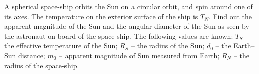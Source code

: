 A spherical space-ship orbits the Sun on a circular orbit, and spin around
one of its axes. The temperature on the exterior surface of the ship is
$T_N$. Find out the apparent magnitude of the Sun and the angular diameter
of the Sun as seen by the astronaut on board of the space-ship. The
following values are known: $T_S$ -- the effective temperature of the Sun;
$R_S$ -- the radius of the Sun; $d_0$ -- the Earth--Sun distance; $m_0$ --
apparent magnitude of Sun measured from Earth; $R_N$ -- the radius of the
space-ship.
